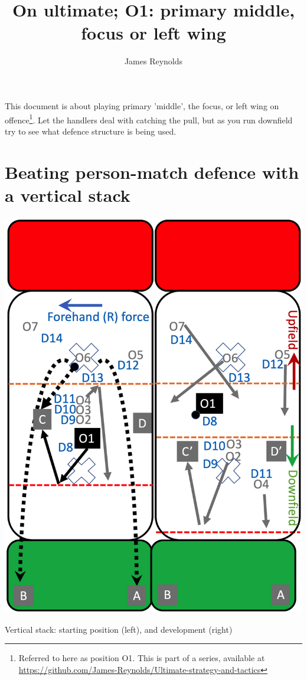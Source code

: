 \documentclass{tufte-handout}
\title{On ultimate; O1: primary middle, focus or left wing}
\author[James Reynolds]{James Reynolds}
\begin{document}
\maketitle%



This document is about 
playing primary 'middle', 
the focus, 
or left wing 
on offence\footnote{
Referred to here 
as position O1.
This
is part of a series, 
available at
\url{https://github.com/James-Reynolds/Ultimate-strategy-and-tactics}}.
Let the handlers 
deal with catching the pull, but
as you run downfield
try to 
see
what defence structure
is being used. 

\section{Beating person-match defence with a vertical stack}\label{sec:vertical}

\begin{marginfigure}%
  \includegraphics[width=\linewidth]{O1-vertical}
  \caption{Vertical stack: 
  starting position (left),
  and development (right)}
  \label{fig:O1-vertical}
\end{marginfigure}
\end{document}
